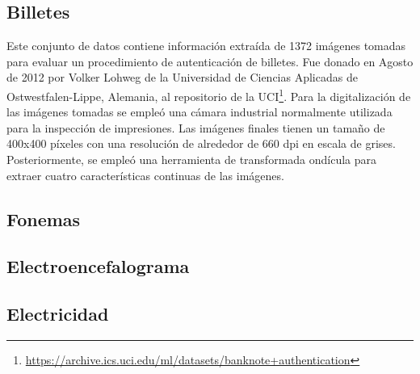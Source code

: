 \subsection{Billetes}

Este conjunto de datos contiene información extraída de 1372 imágenes tomadas para evaluar un procedimiento de autenticación de billetes. Fue donado en Agosto de 2012 por Volker Lohweg de la Universidad de Ciencias Aplicadas de Ostwestfalen-Lippe, Alemania, al repositorio de la UCI\footnote{\url{https://archive.ics.uci.edu/ml/datasets/banknote+authentication}}. Para la digitalización de las imágenes tomadas se empleó una cámara industrial normalmente utilizada para la inspección de impresiones. Las imágenes finales tienen un tamaño de 400x400 píxeles con una resolución de alrededor de 660 dpi en escala de grises. Posteriormente, se empleó una herramienta de transformada ondícula para extraer cuatro características continuas de las imágenes.

\subsection{Fonemas}
\subsection{Electroencefalograma}
\subsection{Electricidad}
